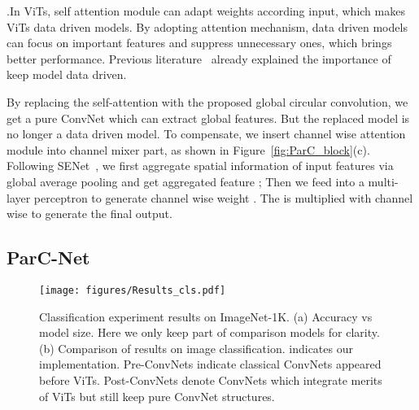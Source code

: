 \documentclass[10pt,twocolumn,letterpaper]{article}
\begin{document}
.In ViTs, self attention module can adapt weights according input, which makes ViTs data driven models. By adopting attention mechanism, data driven models can focus on important features and suppress unnecessary ones, which brings better performance. Previous literature~\cite{hu2018squeeze}\cite{woo2018cbam}\cite{jaderberg2015spatial} already explained the importance of keep model data driven. 

By replacing the self-attention with the proposed global circular convolution, we get a pure ConvNet which can extract global features. But the replaced model is no longer a data driven model. To compensate, we insert channel wise attention module into channel mixer part, as shown in Figure~\ref{fig:ParC_block}(c). Following SENet~\cite{hu2018squeeze}, we first aggregate spatial information of input features  via global average pooling and get aggregated feature ; Then we feed  into a multi-layer perceptron to generate channel wise weight . The  is multiplied with  channel wise to generate the final output. 

\subsection{ParC-Net}
\label{sec:ParC-Net}

\begin{figure*}[t]
\centering
\texttt{[image: figures/Results\_cls.pdf]}
\vspace{-0.3cm}
\caption{Classification experiment results on ImageNet-1K.  (a) Accuracy vs model size. Here we only keep part of comparison models for clarity. (b) Comparison of results on image classification.  indicates our implementation. Pre-ConvNets indicate classical ConvNets appeared before ViTs. Post-ConvNets denote ConvNets which integrate merits of ViTs but still keep pure ConvNet structures.}

\label{fig:res_cls}
\end{figure*}
\end{document}

